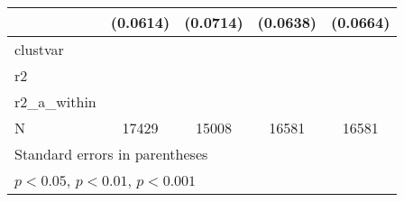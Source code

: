 {\begin{tabular}{l*{4}{c}}
            &    (0.0614)         &    (0.0714)         &    (0.0638)         &    (0.0664)         \\
\hline
clustvar    &                     &                     &                     &                     \\
r2          &                     &                     &                     &                     \\
r2\_a\_within &                     &                     &                     &                     \\
N           &       17429         &       15008         &       16581         &       16581         \\
\hline\hline
\multicolumn{5}{l}{\footnotesize Standard errors in parentheses}\\
\multicolumn{5}{l}{\footnotesize \sym{*} \(p<0.05\), \sym{**} \(p<0.01\), \sym{***} \(p<0.001\)}\\
\end{tabular}
}
